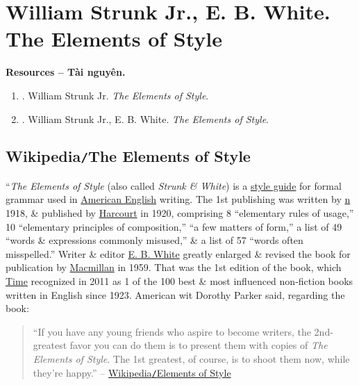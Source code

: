 \documentclass{article}
\begin{document}

\section{{\sc William Strunk Jr., E. B. White}. The Elements of Style}
\textbf{\textsf{Resources -- Tài nguyên.}}
\begin{enumerate}
	\item \cite{Strunk_element_style}. {\sc William Strunk Jr.} {\it The Elements of Style}.
	\item \cite{Strunk_White_element_style}. {\sc William Strunk Jr., E. B. White}. {\it The Elements of Style}.
\end{enumerate}

\subsection{Wikipedia{\tt/}The Elements of Style}
``{\it The Elements of Style} (also called {\it Strunk \& White}) is a \href{https://en.wikipedia.org/wiki/Style_guide}{style guide} for formal grammar used in \href{https://en.wikipedia.org/wiki/American_English}{American English} writing. The 1st publishing was written by \href{https://en.wikipedia.org/wiki/William_Strunk_Jr.} n 1918, \& published by \href{https://en.wikipedia.org/wiki/Harcourt_(publisher)}{Harcourt} in 1920, comprising 8 ``elementary rules of usage,'' 10 ``elementary principles of composition,'' ``a few matters of form,'' a list of 49 ``words \& expressions commonly misused,'' \& a list of 57 ``words often misspelled.'' Writer \& editor \href{https://en.wikipedia.org/wiki/E._B._White}{E. B. White} greatly enlarged \& revised the book for publication by \href{https://en.wikipedia.org/wiki/Macmillan_Publishers}{Macmillan} in 1959. That was the 1st edition of the book, which \href{https://en.wikipedia.org/wiki/Time_(magazine)}{Time} recognized in 2011 as 1 of the 100 best \& most influenced non-fiction books written in English since 1923. American wit Dorothy Parker said, regarding the book:
\begin{quote}
	``If you have any young friends who aspire to become writers, the 2nd-greatest favor you can do them is to present them with copies of {\it The Elements of Style}. The 1st greatest, of course, is to shoot them now, while they're happy.'' -- \href{https://en.wikipedia.org/wiki/The_Elements_of_Style}{Wikipedia{\tt/}Elements of Style}
\end{quote}
\end{document}

